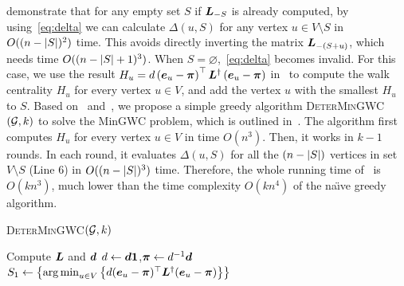 \documentclass[10pt,twocolumn,twoside]{IEEEtran}
\begin{document}
 demonstrate that for any empty set $S$ if \(\boldsymbol{L}_{-S}\)  is already computed, by using~\eqref{eq:delta}  we can calculate \(\Delta(u,S)\) for any vertex \(u\in V\setminus S\) in $O((n-\left|S \right|)^2)$ time.
This avoids directly inverting the matrix \(\boldsymbol{L}_{-(S+u)}\), which needs time $O((n-\left|S \right|+1)^3)$. When \(S=\varnothing\),~\eqref{eq:delta} becomes invalid.  For this case, we use the result \(H_u=d\left( \boldsymbol{e}_u-\boldsymbol{\pi} \right)^\top\boldsymbol{L}^{\dagger}\left( \boldsymbol{e}_u-\boldsymbol{\pi} \right)\) in~ to compute the walk centrality $H_u$ for every vertex $u \in V$, and add the vertex $u$ with the smallest $H_u$ to $S$.  Based on~ and~, we propose a simple greedy algorithm \textsc{DeterMinGWC}$(\mathcal{G},k)$ to solve the MinGWC problem, which is  outlined in~. The algorithm first computes $H_u$ for every vertex $u \in V$ in time $O(n^3)$. Then, it works in $k-1$ rounds. In each round, it evaluates  \(\Delta(u,S)\) for all the $ (n-\left|S \right|)$ vertices in set $V \setminus S$ (Line 6)  in $O((n-\left|S \right|)^3)$ time. Therefore, the whole running time of~ is \(O(kn^3)\),  much lower than the time complexity   \(O(kn^4)\) of the  na\"{\i}ve greedy  algorithm.


\begin{algorithm}
    \caption{\textsc{DeterMinGWC}\((\mathcal{G},k)\)}
    \label{algo:exact-gwcm}
    Compute \(\boldsymbol{L}\) and \(\boldsymbol{d}\)\;
    \(d\gets\boldsymbol{d}\boldsymbol{1}\),\(\boldsymbol{\pi}\gets {d}^{-1}\boldsymbol{d}\)\;
    \(S_1\gets\left\{\operatorname*{arg\,min}_{u\in V}\left\{d(\boldsymbol{e}_u-\boldsymbol{\pi})^\top\boldsymbol{L}^\dagger(\boldsymbol{e}_u-\boldsymbol{\pi}) \right\} \right\}\)\;
\end{algorithm}
\end{document}
